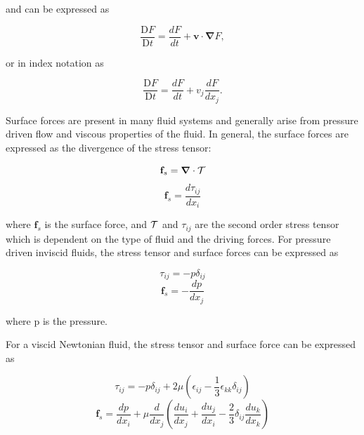 and can be expressed as 

\begin{equation}
    \frac{\text{D}F}{\text{D}t} = \frac{dF}{dt} + \textbf{v} \cdot \boldsymbol{\nabla}F,
\end{equation}

or in index notation as

\begin{equation}
    \frac{\text{D}F}{\text{D}t} = \frac{dF}{dt} + v_j\frac{dF}{dx_j}.
\end{equation}

\par Surface forces are present in many fluid systems and generally arise from pressure driven flow and viscous properties of the fluid. In general, the surface forces are expressed as the divergence of the stress tensor:

\begin{equation}
    \textbf{f}_s = \boldsymbol{\nabla} \cdot \mathcal{T}
\end{equation}
\begin{equation}
    \textbf{f}_s = \frac{d\tau_{ij}}{dx_i}
\end{equation}

\noindent where $\textbf{f}_s$ is the surface force, and $\mathcal{T}$ and $\tau_{ij}$ are the second order stress tensor which is dependent on the type of fluid and the driving forces. For pressure driven inviscid fluids, the stress tensor and surface forces can be expressed as 

\begin{equation}
    \tau_{ij} = -p\delta_{ij}
\end{equation}
\begin{equation}
    \textbf{f}_s = - \frac{dp}{dx_j}
\end{equation}

\noindent where p is the pressure. 

\par For a viscid Newtonian fluid, the stress tensor and surface force can be expressed as

\begin{equation}
    \tau_{ij} = -p\delta_{ij} + 2\mu(\epsilon_{ij} - \frac{1}{3}\epsilon_{kk}\delta_{ij})
\end{equation}
\begin{equation}
    \textbf{f}_s = \frac{dp}{dx_i} + \mu \frac{d}{dx_j}(\frac{du_i}{dx_j} + \frac{du_j}{dx_i} - \frac{2}{3}\delta_{ij}\frac{du_k}{dx_k})
    \label{eqn:viscid_newt_force}
\end{equation}

